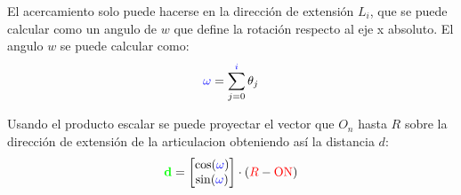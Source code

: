 \documentclass[11pt]{report}
\begin{document}
El acercamiento solo puede hacerse en la dirección de extensión $L_i$, que se puede calcular como un angulo de $w$ que define
la rotación respecto al eje x absoluto. El angulo $w$ se puede calcular como:
\begin{equation*}
  \color{blue}\omega\color{black} = \sum_{j = 0}^{\color{blue}i\color{black}} \theta_j
\end{equation*}

Usando el producto escalar se puede proyectar el vector que $O_n$ hasta $R$ sobre la dirección de extensión de la articulacion
obteniendo así la distancia $d$:
\begin{equation*}
  \color{green} \mathbf{d} \color{black} =
  \begin{bmatrix}
    \cos(\color{blue}\omega\color{black}) \\
    \sin(\color{blue}\omega\color{black})
  \end{bmatrix}
  \cdot (\color{red}R\color{black}- \color{red}\text{ON}\color{black})
\end{equation*}
\end{document}
